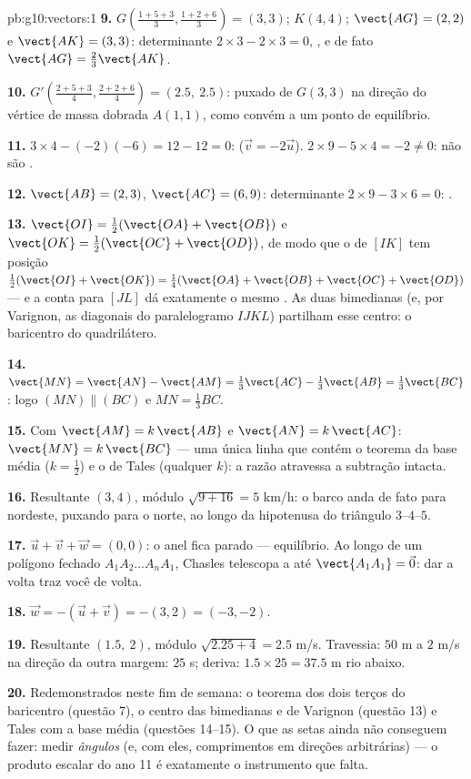 \begin{solution}{pb:g10:vectors:1}
\textbf{9.} $G\left(\frac{1+5+3}{3}, \frac{1+2+6}{3}\right) =
(3, 3)$; $K(4, 4)$; $\vect{AG} = (2, 2)$ e
$\vect{AK} = (3, 3)$: determinante
$2 \times 3 - 2 \times 3 = 0$, , e de fato
$\vect{AG} = \frac23\vect{AK}$.

\textbf{10.} $G'\left(\frac{2 + 5 + 3}{4}, \frac{2 + 2 +
6}{4}\right) = (2.5,\ 2.5)$: puxado de $G(3,3)$ na direção do
vértice de massa dobrada $A(1,1)$, como convém a um ponto de
equilíbrio.

\textbf{11.} $3 \times 4 - (-2)(-6) = 12 - 12 = 0$: 
($\vec v = -2\vec u$). $2 \times 9 - 5 \times 4 = -2 \neq 0$:
não são .

\textbf{12.} $\vect{AB} = (2, 3)$, $\vect{AC} = (6, 9)$:
determinante $2 \times 9 - 3 \times 6 = 0$: .

\textbf{13.} $\vect{OI} = \frac12(\vect{OA} + \vect{OB})$ e
$\vect{OK} = \frac12(\vect{OC} + \vect{OD})$, de modo que o
 de $[IK]$ tem  posição
$\frac12(\vect{OI} + \vect{OK}) = \frac14(\vect{OA} +
\vect{OB} + \vect{OC} + \vect{OD})$ --- e a conta para $[JL]$
dá exatamente o mesmo . As duas bimedianas (e, por
Varignon, as diagonais do paralelogramo $IJKL$) partilham esse
centro: o baricentro do quadrilátero.

\textbf{14.} $\vect{MN} = \vect{AN} - \vect{AM} =
\frac13\vect{AC} - \frac13\vect{AB} = \frac13\vect{BC}$:
logo $(MN) \parallel (BC)$ e $MN = \frac13 BC$.

\textbf{15.} Com $\vect{AM} = k\,\vect{AB}$ e
$\vect{AN} = k\,\vect{AC}$: $\vect{MN} = k\,\vect{BC}$ --- uma
única linha que contém o teorema da base média
($k = \frac12$) e o de Tales (qualquer $k$): a razão atravessa
a subtração intacta.

\textbf{16.} Resultante $(3, 4)$, módulo
$\sqrt{9 + 16} = 5$ km/h: o barco anda de fato para nordeste,
puxando para o norte, ao longo da hipotenusa do triângulo
$3$--$4$--$5$.

\textbf{17.} $\vec u + \vec v + \vec w = (0, 0)$: o anel fica
parado --- equilíbrio. Ao longo de um polígono fechado
$A_1 A_2 \dots A_n A_1$, Chasles telescopa a  até
$\vect{A_1 A_1} = \vec 0$: dar a volta traz você de volta.

\textbf{18.} $\vec w = -(\vec u + \vec v) = -(3, 2) =
(-3, -2)$.

\textbf{19.} Resultante $(1.5,\ 2)$, módulo
$\sqrt{2.25 + 4} = 2.5$ m/s. Travessia: $50$ m a $2$ m/s na
direção da outra margem: $25$ s; deriva:
$1.5 \times 25 = 37.5$ m rio abaixo.

\textbf{20.} Redemonstrados neste fim de semana: o teorema dos
dois terços do baricentro (questão 7), o centro das
bimedianas e de Varignon (questão 13) e Tales com a base média
(questões 14--15). O que as setas ainda não conseguem fazer:
medir \emph{ângulos} (e, com eles, comprimentos em direções
arbitrárias) --- o produto escalar do ano 11 é exatamente o
instrumento que falta.
\end{solution}
